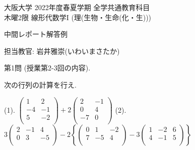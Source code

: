 \documentclass[dvipdfmx,a4paper,11pt]{article}
\theoremstyle{definition}
\begin{document}
\begin{center}
{ \large 大阪大学 2022年度春夏学期 全学共通教育科目 \\ 木曜2限 線形代数学I (理(生物・生命(化・生)))} \\
\vspace{5pt}

{\LARGE 中間レポート解答例 } \\
\vspace{5pt}

\end{center}

\begin{flushright}
 担当教官: 岩井雅崇(いわいまさたか) 
\end{flushright}

 {\Large 第1問} (授業第2-3回の内容).
 
 \vspace{11pt}
次の行列の計算を行え.
 
  \vspace{11pt}
(1).
$
 \begin{pmatrix}
 1 &2 \\
 -4&-1\\
  5&-2\\
 \end{pmatrix}
 + 2
 \begin{pmatrix}
 2 &-1 \\
  0&4\\
  -7&0\\
 \end{pmatrix}
 $
(2).
$
3 \begin{pmatrix}
 2 &-1&4 \\
 0&3&-5\\
 \end{pmatrix}
 - 2
 \left\{
 \begin{pmatrix}
 0 &1&-2 \\
 7&-5&4\\
 \end{pmatrix}
 - 3
  \begin{pmatrix}
 1 &-2&6 \\
 4&-1&5\\
 \end{pmatrix}
\right\}
 $
 
  \vspace{11pt}
 
\end{document}
